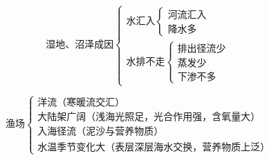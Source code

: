 \documentclass[UTF8]{ctexart}
\begin{document}
\begin{multicols}{2}
    
    \[
        \textbf{湿地、沼泽成因}
        \begin{cases}
            \text{水汇入}
            \begin{cases}
                \text{河流汇入}\\
                \text{降水多}
            \end{cases}\\
            \text{水排不走}
            \begin{cases}
                \text{排出径流少}\\
                \text{蒸发少}\\
                \text{下渗不多}
            \end{cases}
        \end{cases}
    \]

    \[
        \textbf{渔场}
        \begin{cases}
            \text{洋流（寒暖流交汇）}\\
            \text{大陆架广阔（浅海光照足，光合作用强，含氧量大）}\\
            \text{入海径流（泥沙与营养物质）}\\
            \text{水温季节变化大（表层深层海水交换，营养物质上泛）}
        \end{cases}
    \]

\end{multicols}

\par 
\end{document}
